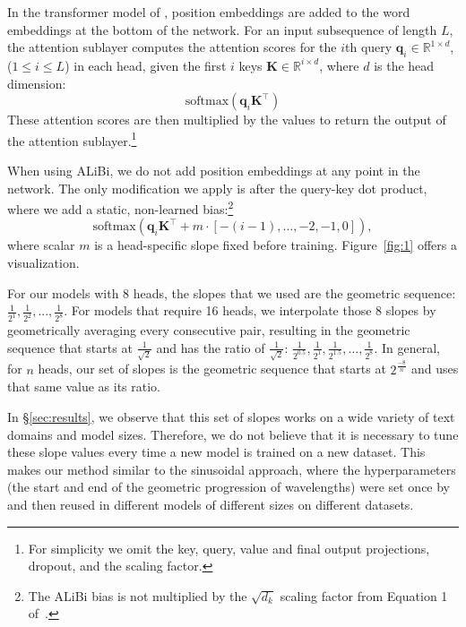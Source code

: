 In the transformer model of \citet{vaswani}, position embeddings are added to the word embeddings at the bottom of the network. %
For an input subsequence of length $L$, the attention sublayer %
computes the attention scores for the $i$th
query $\mathbf{q}_i \in \mathbb{R}^{1\times d}$, ($1 \leq i \leq L$) in each head, given the first $i$ keys $\mathbf{K} \in \mathbb{R}^{i\times d}$, where $d$ is the head dimension:%
\begin{equation*}
\text{softmax}(\mathbf{q}_i \mathbf{K}^\top)
\end{equation*}
These attention scores are then multiplied by the values to return the output of the attention sublayer.\footnote{For simplicity we omit the key, query, value and final output projections, dropout, and the scaling factor.}

When using ALiBi, we do not add position embeddings at any point in the network. %
The only modification we apply is after the query-key dot product, where we add a static, non-learned bias:\footnote{The ALiBi bias is not multiplied by the $\sqrt{d_k}$ scaling factor from Equation 1 of~\citet{vaswani}.}
\begin{equation*}
\text{softmax}(\mathbf{q}_i \mathbf{K}^\top + m \cdot [-(i-1), ..., -2, -1, 0]), 
\end{equation*}
where scalar $m$ is a head-specific slope fixed before training.
Figure~\ref{fig:1} offers a visualization. 

For our models with 8 heads, the slopes that we used are the geometric sequence: %
${\frac{1}{2^1}, \frac{1}{2^2}, ..., \frac{1}{2^8}}$. 
For models that require 16 heads, we interpolate those 8 slopes by geometrically averaging every consecutive pair, resulting in the geometric sequence that starts at $\frac{1}{\sqrt{2}}$ and has the ratio of $\frac{1}{\sqrt{2}}$: ${\frac{1}{2^{0.5}}, \frac{1}{2^1}, \frac{1}{2^{1.5}}, ..., \frac{1}{2^{8}}}$. In general, for $n$ heads, our set of slopes is the geometric sequence that starts at %
$2^{\frac{-8}{n}}$
and uses that same value as its ratio.  

In \S\ref{sec:results}, we observe that this set of slopes works on a wide variety of text domains and model sizes. Therefore, we do not believe that it is necessary to tune these slope values every time a new model is trained on a new dataset. This makes our method similar to the sinusoidal approach, where the hyperparameters (the start and end of the geometric progression of wavelengths) were set once by~\citet{vaswani} and then reused in different models of different sizes on different datasets.  

